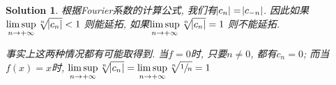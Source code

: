 \documentclass[a4paper, 12pt]{ctexart}
\theoremstyle{plain}
\theoremstyle{plain}
\theoremstyle{plain}
\theoremstyle{nonumberplain}
\newtheorem{solution}{Solution}
\begin{document}
    \begin{solution}
        根据Fourier系数的计算公式, 我们有$\abs{c_{n}}=\abs{c_{-n}}$.
        因此如果$\displaystyle\limsup_{n\to +\infty}{\sqrt[n]{\abs{c_{n}}}} < 1$
        则能延拓,
        如果$\displaystyle\limsup_{n\to +\infty}{\sqrt[n]{\abs{c_{n}}}} = 1$
        则不能延拓.

        事实上这两种情况都有可能取得到. 当$f=0$时, 只要$n\neq 0$, 都有$c_{n}=0$; 而当
        $f(x)=x$时,
        $\displaystyle\limsup_{n\to +\infty}{\sqrt[n]{\abs{c_{n}}}}=
        \limsup_{n\to +\infty}{\sqrt[n]{\sfrac{1}{n}}} = 1$
    \end{solution}


\end{document}
